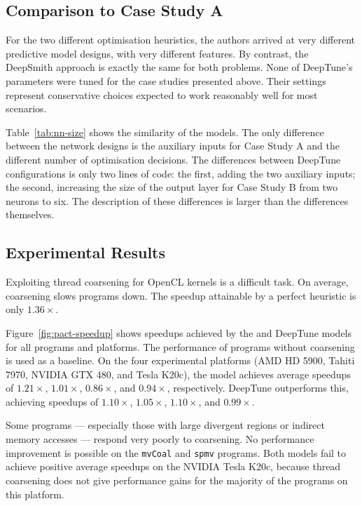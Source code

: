 \subsection{Comparison to Case Study A}

For the two different optimisation heuristics, the authors arrived at very different predictive model designs, with very different features. By contrast, the DeepSmith approach is exactly the same for both problems. None of DeepTune's parameters were tuned for the case studies presented above. Their settings represent conservative choices expected to work reasonably well for most scenarios.

Table~\ref{tab:nn-size} shows the similarity of the models. The only difference between the network designs is the auxiliary inputs for Case Study A and the different number of optimisation decisions. The differences between DeepTune configurations is only two lines of code: the first, adding the two auxiliary inputs; the second, increasing the size of the output layer for Case Study B from two neurons to six. The description of these differences is larger than the differences themselves.




\subsection{Experimental Results}

Exploiting thread coarsening for OpenCL kernels is a difficult task. On average, coarsening slows programs down. The speedup attainable by a perfect heuristic is only $1.36\times$.

Figure~\ref{fig:pact-speedup} shows speedups achieved by the \citeauthor{Magni2014} and DeepTune models for all programs and platforms. The performance of programs without coarsening is used as a baseline. On the four experimental platforms (AMD HD 5900, Tahiti 7970, NVIDIA GTX 480, and Tesla K20c), the \citeauthor{Magni2014} model achieves average speedups of $1.21\times$, $1.01\times$, $0.86\times$, and $0.94\times$, respectively. DeepTune outperforms this, achieving speedups of $1.10\times$, $1.05\times$, $1.10\times$, and $0.99\times$.

Some programs --- especially those with large divergent regions or indirect memory accesses --- respond very poorly to coarsening. No performance improvement is possible on the \texttt{mvCoal} and \texttt{spmv} programs. Both models fail to achieve positive average speedups on the NVIDIA Tesla K20c, because thread coarsening does not give performance gains for the majority of the programs on this platform.

